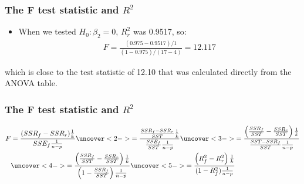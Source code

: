 \documentclass[handout]{beamer}\usepackage[]{graphicx}\usepackage[]{color}
\numberwithin{equation}{section}
\begin{document}
\begin{frame}
\frametitle{The F test statistic and $R^2$}
\begin{itemize}
\item When we tested $H_0: \beta_2 = 0$, $R^2_r$ was 0.9517, so:
\pause \begin{align*}
F = \frac{(0.975  - 0.9517)/ 1}{(1-0.975)/(17-4)} = 12.117
\end{align*}
\end{itemize}
\pause which is close to the test statistic of 12.10 that was calculated directly from the ANOVA table.
\end{frame}

\begin{frame}
\frametitle{The F test statistic and $R^2$}
\begin{align*}
F &= \frac{(SSR_f - SSR_r) \frac{1}{k}}{SSE_f \frac{1}{n-p}} \uncover<2->{= \frac{\frac{SSR_f - SSR_r}{SST} \frac{1}{k}}{\frac{SSE_f}{SST} \frac{1}{n-p}}} \uncover<3->{ = \frac{\left (\frac{SSR_f }{SST}- \frac{SSR_r}{SST} \right ) \frac{1}{k}}{\frac{SST - SSR_f}{SST} \frac{1}{n-p}}} \\
&\uncover<4->{= \frac{\left (\frac{SSR_f }{SST}- \frac{SSR_r}{SST} \right ) \frac{1}{k}}{ \left ( 1 - \frac{SSR_f}{SST} \right )  \frac{1}{n-p}}} \uncover<5->{ =  \frac{\left (R^2_f - R^2_r \right ) \frac{1}{k}}{(1 - R^2_f) \frac{1}{n-p}}}
\end{align*}
\end{frame}
\end{document}

